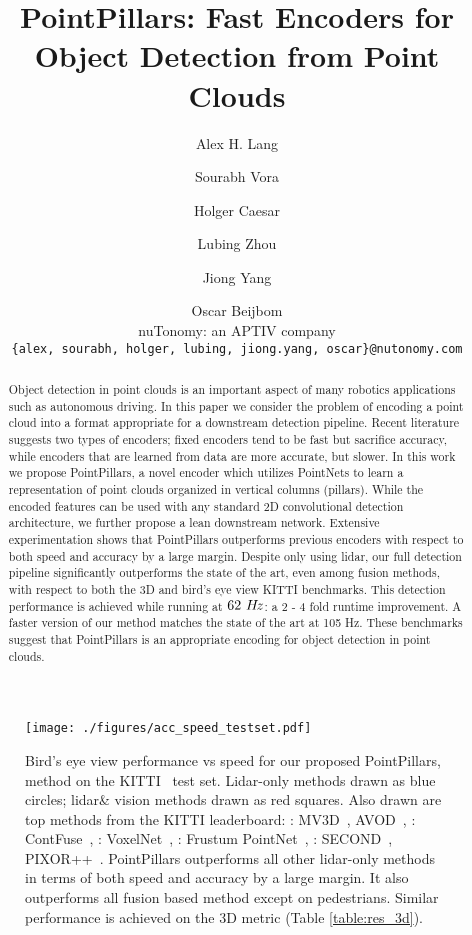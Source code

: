\documentclass[10pt,twocolumn,letterpaper]{article}
\newcommand{\hertz}{$62~H\hspace{-.5mm}z$\xspace} \newcommand{\maxhertz}{$105~H\hspace{-.5mm}z$\xspace} \newcommand{\decorate}{9\xspace} \newcommand{\maxpillars}{12000\xspace} \newcommand{\maxpts}{100\xspace} \newcommand{\xyres}{0.16\xspace} \newcommand{\lidar}{lidar\xspace}
\newcommand{\tableref}[1]{Table \ref{#1}}
\newcommand{\squeeze}{\vspace{-0.5mm}}
\begin{document}
\title{PointPillars: Fast Encoders for Object Detection from Point Clouds}

\author{
Alex H. Lang \and Sourabh Vora \and  Holger Caesar \and  Lubing Zhou \and  Jiong Yang \and  Oscar Beijbom \\
nuTonomy: an APTIV company\\
{\tt\small \{alex, sourabh, holger, lubing, jiong.yang, oscar\}@nutonomy.com}
}



\maketitle


\begin{abstract}
Object detection in point clouds is an important aspect of many robotics applications such as autonomous driving. 
In this paper we consider the problem of encoding a point cloud into a format appropriate for a downstream detection pipeline.
Recent literature suggests two types of encoders; fixed encoders tend to be fast but sacrifice accuracy, while encoders that are learned from data are more accurate, but slower.
In this work we propose PointPillars, a novel encoder which utilizes PointNets to learn a representation of point clouds organized in vertical columns (pillars).
While the encoded features can be used with any standard 2D convolutional detection architecture, we further propose a lean downstream network.
Extensive experimentation shows that PointPillars outperforms previous encoders with respect to both speed and accuracy by a large margin.
Despite only using lidar, our full detection pipeline significantly outperforms the state of the art, even among fusion methods, with respect to both the 3D and bird's eye view KITTI benchmarks.
This detection performance is achieved while running at \hertz: a 2 - 4 fold runtime improvement.
A faster version of our method matches the state of the art at 105 Hz.
These benchmarks suggest that PointPillars is an appropriate encoding for object detection in point clouds.
\end{abstract}

\begin{figure}
\begin{center}
\texttt{[image: ./figures/acc\_speed\_testset.pdf]}
\end{center}
\squeeze
\caption{Bird's eye view performance vs speed for our proposed PointPillars,  method on the KITTI~\cite{kitti} test set.
Lidar-only methods drawn as blue circles; \lidar \& vision methods drawn as red squares.
Also drawn are top methods from the KITTI leaderboard: : MV3D~\cite{mv3d},  AVOD~\cite{avod}, : ContFuse~\cite{contfuse}, : VoxelNet~\cite{voxelnet}, : Frustum PointNet~\cite{frustum}, : SECOND~\cite{second},  PIXOR++~\cite{hdnet}.
PointPillars outperforms all other \lidar-only methods in terms of both speed and accuracy by a large margin.
It also outperforms all fusion based method except on pedestrians. 
Similar performance is achieved on the 3D metric (\tableref{table:res_3d}). 
 }
\label{fig:speed_accuracy}
\end{figure}
\end{document}
